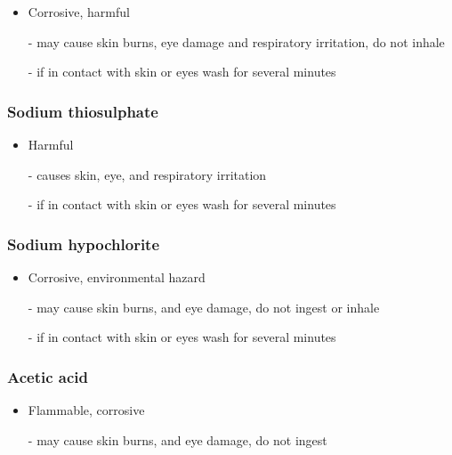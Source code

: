 \documentclass[a4paper, british]{article}
\begin{document}
\begin{appendices}
\begin{itemize}
    \item Corrosive, harmful
    \item[-] may cause skin burns, eye damage and respiratory irritation, do not inhale
    \item[-] if in contact with skin or eyes wash for several minutes
\end{itemize}

\subsubsection*{Sodium thiosulphate}

\begin{itemize}
    \item Harmful
    \item[-] causes skin, eye, and respiratory irritation
    \item[-] if in contact with skin or eyes wash for several minutes
\end{itemize}

\subsubsection*{Sodium hypochlorite}

\begin{itemize}
    \item Corrosive, environmental hazard
    \item[-] may cause skin burns, and eye damage, do not ingest or inhale
    \item[-] if in contact with skin or eyes wash for several minutes
\end{itemize}

\subsubsection*{Acetic acid}

\begin{itemize}
    \item Flammable, corrosive
    \item[-] may cause skin burns, and eye damage, do not ingest 
\end{itemize}
    
\end{appendices}
\end{document}
